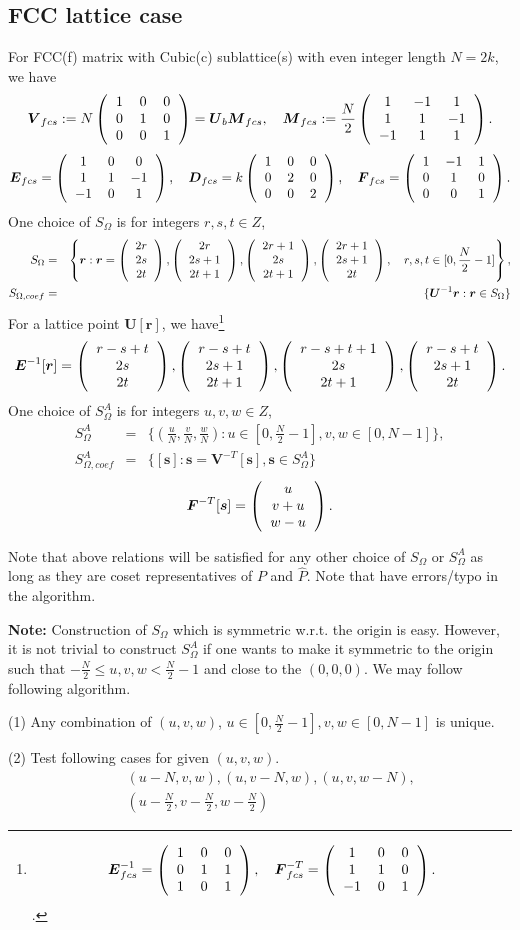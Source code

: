 \documentclass[10pt]{book}
\def\bm{\boldsymbol}
\newcommand{\bea}{\begin{eqnarray}}
\newcommand{\eea}{\end{eqnarray}}
\newcommand{\no}{\nonumber \\}
\def\vr{{\bm r}}
\newcommand{\colmthr}[3]
{\left(\begin{tabular}{c} {$#1$}\\{$#2$}\\{$#3$}\end{tabular}\right)}
\newcommand{\threedmat}[9]
{\left(\begin{tabular}{ccc} {$#1$}&{$#2$}&{$#3$} \\
		{$#4$}&{$#5$}&{$#6$}\\
		{$#7$}&{$#8$}&{$#9$}\\
	    \end{tabular}\right)}
\begin{document}
\subsection{FCC lattice case}
For  FCC(f) matrix with Cubic(c) sublattice(s) with even integer length $N=2k$, we have
\bea 
{\bm V}_{fcs}:=N\threedmat{1}{0}{0}{0}{1}{0}{0}{0}{1}={\bm U}_b{\bm M}_{fcs},\quad 
{\bm M}_{fcs}:=\frac{N}{2} \threedmat{1}{-1}{1}{1}{1}{-1}{-1}{1}{1}.
\eea 
\bea 
{\bm E}_{fcs}=\threedmat{1}{0}{0}{1}{1}{-1}{-1}{0}{1},\quad 
{\bm D}_{fcs}=k\threedmat{1}{0}{0}{0}{2}{0}{0}{0}{2},\quad 
{\bm F}_{fcs}=\threedmat{1}{-1}{1}{0}{1}{0}{0}{0}{1}. 
\eea 
One choice of $S_{\Omega}$ is for integers $r,s,t\in Z$,
\bea 
S_{\Omega}&=&\left\{ {\bm r} : {\bm r}=
\colmthr{2r}{2s}{2t},\colmthr{2r}{2s+1}{2t+1}, \colmthr{2r+1}{2s}{2t+1},\colmthr{2r+1}{2s+1}{2t} 
   ,\quad  r,s,t \in [0,\frac{N}{2}-1]\right\},\no 
S_{\Omega,coef}&=&\{ {\bm U}^{-1}{\bm r} : {\bm r}\in S_\Omega\} 
\eea  
For a lattice point ${\bm U}[\vr]$, we have\footnote{
$${\bm E}^{-1}_{fcs}= \threedmat{1}{0}{0}{0}{1}{1}{1}{0}{1},\quad 
  {\bm F}^{-T}_{fcs}= \threedmat{1}{0}{0}{1}{1}{0}{-1}{0}{1}.
$$.
}  
\bea 
{\bm E}^{-1}[\vr]=\colmthr{r-s+t}{2s}{2t},\colmthr{r-s+t}{2s+1}{2t+1},
                                        \colmthr{r-s+t+1}{2s}{2t+1},\colmthr{r-s+t}{2s+1}{2t}.
\eea 
One choice of $S^A_\Omega$ is for integers $u,v,w\in Z$,
\bea 
S^A_\Omega&=& \{ (\frac{u}{N},\frac{v}{N},\frac{w}{N}) :  u \in [0,\frac{N}{2}-1], v,w\in [0,N-1] \}, \no 
S^A_{\Omega,coef}&=& \{ [{\bm s}] : {\bm s}={\bm V}^{-T}[{\bm s}],{\bm s}\in  S^A_\Omega \} 
\eea 
\bea 
{\bm F}^{-T}[{\bm s}]=\colmthr{u}{v+u}{w-u}.
\eea  

Note that above relations will be satisfied for any other choice of $S_\Omega$ or $S^A_\Omega$
as long as they are coset representatives of $P$ and $\hat{P}$. 
Note that \cite{Zheng} have errors/typo in the algorithm.  

{\bf Note:} Construction of $S_{\Omega}$ which is symmetric w.r.t. the origin is easy.
However, it is not trivial to construct $S^A_\Omega$ if one wants to make it symmetric to the origin
such that  $-\frac{N}{2}\leq u,v,w< \frac{N}{2}-1 $ and close to the $(0,0,0)$. 
We may follow following algorithm.

(1) Any combination of $(u,v,w)$, $u\in [0,\frac{N}{2}-1], v, w\in [0,N -1]$ is unique. 

(2) Test following cases for given $(u,v,w)$.
\bea 
& &(u-N,v,w), (u,v-N,w),(u,v,w-N),\no 
& &(u-\frac{N}{2},v-\frac{N}{2},w-\frac{N}{2})
\eea 
\end{document}
